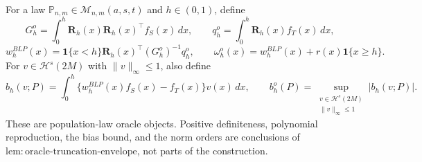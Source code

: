 For a law \(\mathbb P_{n,m}\in\mathcal M_{n,m}(a,s,t)\) and \(h\in(0,1)\), define
\[
G_h^o=\int_0^h\mathbf R_h(x)\mathbf R_h(x)^\top f_S(x)\,dx,
\qquad
q_h^o=\int_0^h\mathbf R_h(x)f_T(x)\,dx,
\]
\[
w_h^{BLP}(x)=\mathbf 1\{x<h\}\mathbf R_h(x)^\top(G_h^o)^{-1}q_h^o,
\qquad
\omega_h^o(x)=w_h^{BLP}(x)+r(x)\mathbf 1\{x\ge h\}.
\]
For \(v\in\mathcal H^s(2M)\) with \(\|v\|_\infty\le1\), also define
\[
b_h(v;P)=\int_0^h\{w_h^{BLP}(x)f_S(x)-f_T(x)\}v(x)\,dx,
\qquad
b_h^o(P)=\sup_{\substack{v\in\mathcal H^s(2M)\\ \|v\|_\infty\le1}}|b_h(v;P)|.
\]
These are population-law oracle objects. Positive definiteness, polynomial reproduction, the bias bound, and the norm orders are conclusions of \(\mathrm{lem:oracle\text{-}truncation\text{-}envelope}\), not parts of the construction.
